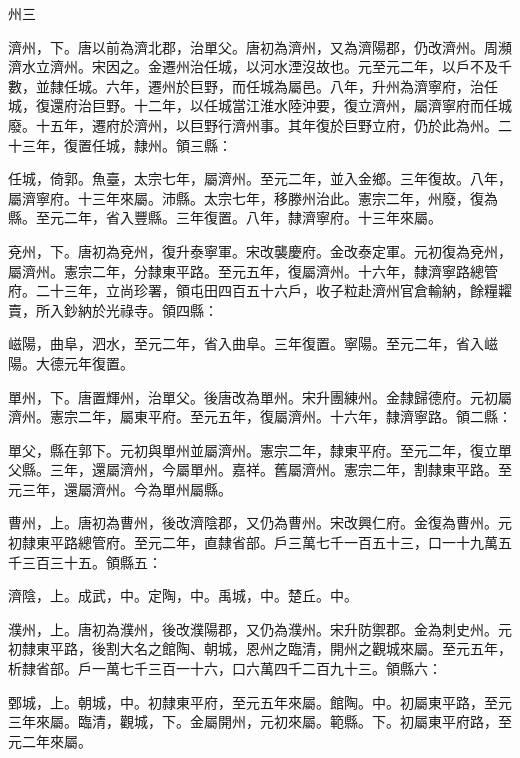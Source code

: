 \begin{pinyinscope}
 州三



 濟州，下。唐以前為濟北郡，治單父。唐初為濟州，又為濟陽郡，仍改濟州。周瀕濟水立濟州。宋因之。金遷州治任城，以河水湮沒故也。元至元二年，以戶不及千數，並隸任城。六年，遷州於巨野，而任城為屬邑。八年，升州為濟寧府，治任城，復還府治巨野。十二年，以任城當江淮水陸沖要，復立濟州，屬濟寧府而任城廢。十五年，遷府於濟州，以巨野行濟州事。其年復於巨野立府，仍於此為州。二十三年，復置任城，隸州。領三縣：



 任城，倚郭。魚臺，太宗七年，屬濟州。至元二年，並入金鄉。三年復故。八年，屬濟寧府。十三年來屬。沛縣。太宗七年，移滕州治此。憲宗二年，州廢，復為縣。至元二年，省入豐縣。三年復置。八年，隸濟寧府。十三年來屬。



 兗州，下。唐初為兗州，復升泰寧軍。宋改襲慶府。金改泰定軍。元初復為兗州，屬濟州。憲宗二年，分隸東平路。至元五年，復屬濟州。十六年，隸濟寧路總管府。二十三年，立尚珍署，領屯田四百五十六戶，收子粒赴濟州官倉輸納，餘糧糶賣，所入鈔納於光祿寺。領四縣：



 嵫陽，曲阜，泗水，至元二年，省入曲阜。三年復置。寧陽。至元二年，省入嵫陽。大德元年復置。



 單州，下。唐置輝州，治單父。後唐改為單州。宋升團練州。金隸歸德府。元初屬濟州。憲宗二年，屬東平府。至元五年，復屬濟州。十六年，隸濟寧路。領二縣：



 單父，縣在郭下。元初與單州並屬濟州。憲宗二年，隸東平府。至元二年，復立單父縣。三年，還屬濟州，今屬單州。嘉祥。舊屬濟州。憲宗二年，割隸東平路。至元三年，還屬濟州。今為單州屬縣。



 曹州，上。唐初為曹州，後改濟陰郡，又仍為曹州。宋改興仁府。金復為曹州。元初隸東平路總管府。至元二年，直隸省部。戶三萬七千一百五十三，口一十九萬五千三百三十五。領縣五：



 濟陰，上。成武，中。定陶，中。禹城，中。楚丘。中。



 濮州，上。唐初為濮州，後改濮陽郡，又仍為濮州。宋升防禦郡。金為刺史州。元初隸東平路，後割大名之館陶、朝城，恩州之臨清，開州之觀城來屬。至元五年，析隸省部。戶一萬七千三百一十六，口六萬四千二百九十三。領縣六：



 鄄城，上。朝城，中。初隸東平府，至元五年來屬。館陶。中。初屬東平路，至元三年來屬。臨清，觀城，下。金屬開州，元初來屬。範縣。下。初屬東平府路，至元二年來屬。




\end{pinyinscope}
